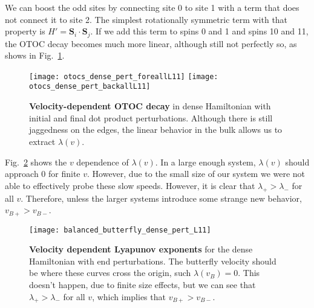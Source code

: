 We can boost the odd sites by connecting site 0 to site 1 with a term that does not connect it to site 2. The simplest rotationally symmetric term with that property is $H'=\bm{S}_i\cdot\bm{S}_j$. If we add this term to spins 0 and 1 and spins 10 and 11, the OTOC decay becomes much more linear, although still not perfectly so, as shows in Fig.~\ref{fig:otocs_pert}.
\begin{figure}
	\centering
	\texttt{[image: otocs\_dense\_pert\_foreallL11]}
	\texttt{[image: otocs\_dense\_pert\_backallL11]}
	\caption{\textbf{Velocity-dependent OTOC decay} in dense Hamiltonian with initial and final dot product perturbations. Although there is still jaggedness on the edges, the linear behavior in the bulk allows us to extract $\lambda(v)$.}
	\label{fig:otocs_pert}
\end{figure}

Fig.~\ref{fig:balanced_butterfly_dense_pert_L11} shows the $v$ dependence of $\lambda(v)$. In a large enough system, $\lambda(v)$ should approach 0 for finite $v$. However, due to the small size of our system we were not able to effectively probe these slow speeds. However, it is clear that $\lambda_+>\lambda_-$ for all $v$. Therefore, unless the larger systems introduce some strange new behavior, $v_{B+}>v_{B-}$.
\begin{figure}
	\centering
	\texttt{[image: balanced\_butterfly\_dense\_pert\_L11]}
	\caption{\textbf{Velocity dependent Lyapunov exponents} for the dense Hamiltonian with end perturbations. The butterfly velocity should be where these curves cross the origin, such $\lambda(v_B) = 0$. This doesn't happen, due to finite size effects, but we can see that $\lambda_+>\lambda_-$ for all $v$, which implies that $v_{B+}>v_{B-}$.}
	\label{fig:balanced_butterfly_dense_pert_L11}
\end{figure}